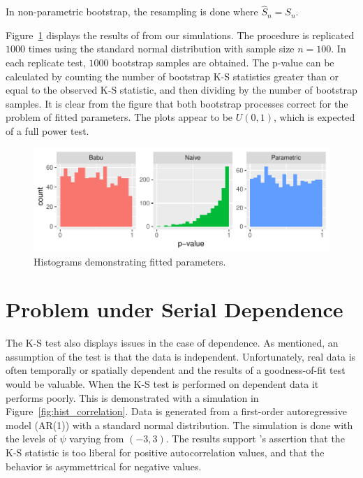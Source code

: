 \documentclass[12pt, letterpaper, titlepage]{article}
\begin{document}
In non-parametric bootstrap, the resampling is done where $\hat{S}_n = S_n$.

Figure~\ref{fig:hist_fitted} displays the results of from our simulations. The procedure 
is replicated $1000$ times using the standard normal distribution with sample size $n=100$. 
In each replicate test, $1000$ bootstrap samples are obtained. The p-value can be calculated
by counting the number of bootstrap K-S statistics greater than or equal to the observed K-S statistic, 
and then dividing by the number of bootstrap samples. It is clear from the figure that both
bootstrap processes correct for the problem of fitted parameters. The plots appear to be
$U(0,1)$, which is expected of a full power test.

\begin{figure}[tbp]
  \centering
  \includegraphics{hist_fitted}
  \caption{Histograms demonstrating fitted parameters.}
  \label{fig:hist_fitted}
\end{figure}

\hypertarget{sec:dependence}{%
\section{Problem under Serial Dependence}\label{sec:dependence}}

The K-S test also displays issues in the case of dependence. As mentioned, an assumption of the 
test is that the data is independent. Unfortunately, real data is often temporally
or spatially dependent and the results of a goodness-of-fit test would be valuable. 
When the K-S test is performed on dependent data it performs poorly. This is demonstrated
with a simulation in Figure~\ref{fig:hist_correlation}. Data is generated from a
first-order autoregressive model (AR(1)) with a standard normal distribution. The simulation
is done with the levels of $\psi$ varying from $(-3,3)$. The results support \citet{Durilleul}'s 
assertion that the K-S statistic is too liberal for positive autocorrelation values, and 
that the behavior is asymmettrical for negative values.
\end{document}
